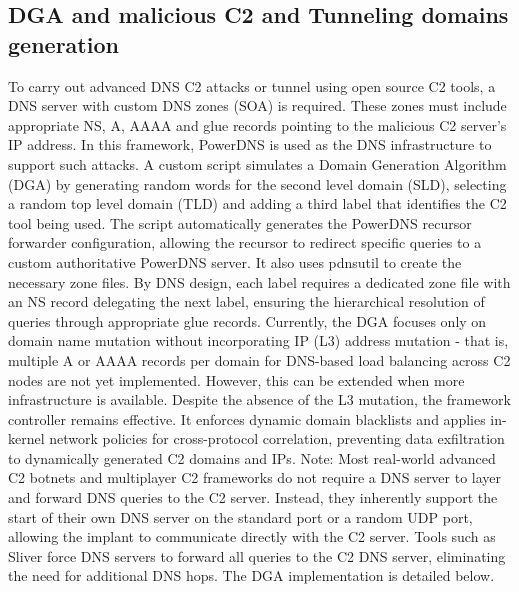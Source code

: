 \documentclass [11pt, proquest] {uwthesis}[2020/02/24]
\begin{document}
\subsection{DGA and malicious C2 and Tunneling domains generation}
To carry out advanced DNS C2 attacks or tunnel using open source C2 tools, a DNS server with custom DNS zones (SOA) is required. These zones must include appropriate NS, A, AAAA and glue records pointing to the malicious C2 server’s IP address. In this framework, PowerDNS is used as the DNS infrastructure to support such attacks. A custom script simulates a Domain Generation Algorithm (DGA) by generating random words for the second level domain (SLD), selecting a random top level domain (TLD) and adding a third label that identifies the C2 tool being used. The script automatically generates the PowerDNS recursor forwarder configuration, allowing the recursor to redirect specific queries to a custom authoritative PowerDNS server. It also uses pdnsutil to create the necessary zone files. By DNS design, each label requires a dedicated zone file with an NS record delegating the next label, ensuring the hierarchical resolution of queries through appropriate glue records. Currently, the DGA focuses only on domain name mutation without incorporating IP (L3) address mutation - that is, multiple A or AAAA records per domain for DNS-based load balancing across C2 nodes are not yet implemented. However, this can be extended when more infrastructure is available. Despite the absence of the L3 mutation, the framework controller remains effective. It enforces dynamic domain blacklists and applies in-kernel network policies for cross-protocol correlation, preventing data exfiltration to dynamically generated C2 domains and IPs. Note: Most real-world advanced C2 botnets and multiplayer C2 frameworks do not require a DNS server to layer and forward DNS queries to the C2 server. Instead, they inherently support the start of their own DNS server on the standard port or a random UDP port, allowing the implant to communicate directly with the C2 server. Tools such as Sliver force DNS servers to forward all queries to the C2 DNS server, eliminating the need for additional DNS hops.
The DGA implementation is detailed below.
\end{document}
